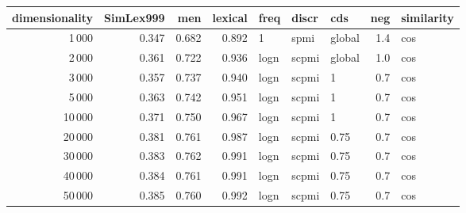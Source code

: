 \begin{tabular}{rrrrlllrl}
\toprule
 dimensionality &  SimLex999 &    men &  lexical &  freq &  discr &     cds &  neg & similarity \\
\midrule
           1\,000 &      0.347 &  0.682 &    0.892 &     1 &   spmi &  global &  1.4 &        cos \\
           2\,000 &      0.361 &  0.722 &    0.936 &  logn &  scpmi &  global &  1.0 &        cos \\
           3\,000 &      0.357 &  0.737 &    0.940 &  logn &  scpmi &       1 &  0.7 &        cos \\
           5\,000 &      0.363 &  0.742 &    0.951 &  logn &  scpmi &       1 &  0.7 &        cos \\
          10\,000 &      0.371 &  0.750 &    0.967 &  logn &  scpmi &       1 &  0.7 &        cos \\
          20\,000 &      0.381 &  0.761 &    0.987 &  logn &  scpmi &    0.75 &  0.7 &        cos \\
          30\,000 &      0.383 &  0.762 &    0.991 &  logn &  scpmi &    0.75 &  0.7 &        cos \\
          40\,000 &      0.384 &  0.761 &    0.991 &  logn &  scpmi &    0.75 &  0.7 &        cos \\
          50\,000 &      0.385 &  0.760 &    0.992 &  logn &  scpmi &    0.75 &  0.7 &        cos \\
\bottomrule
\end{tabular}
